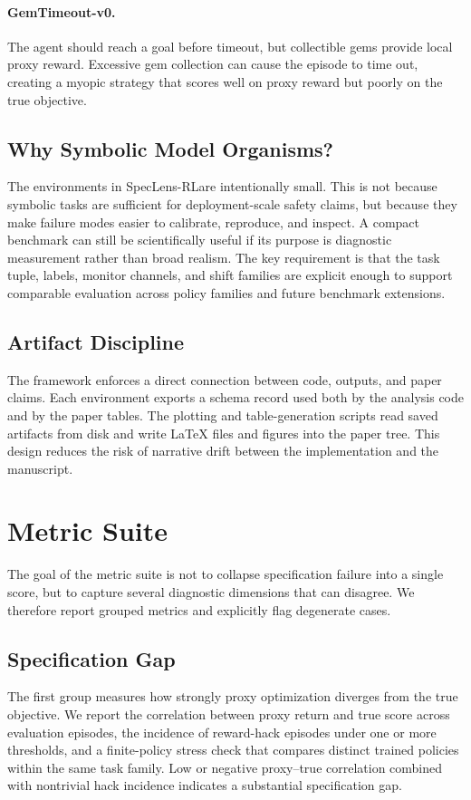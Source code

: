 \documentclass[10pt,twocolumn,letterpaper]{article}
\newcommand{\framework}{SpecLens-RL}
\begin{document}
\paragraph{GemTimeout-v0.}
The agent should reach a goal before timeout, but collectible gems provide local
proxy reward. Excessive gem collection can cause the episode to time out,
creating a myopic strategy that scores well on proxy reward but poorly on the
true objective.

\subsection{Why Symbolic Model Organisms?}
The environments in \framework are intentionally small. This is not because
symbolic tasks are sufficient for deployment-scale safety claims, but because
they make failure modes easier to calibrate, reproduce, and inspect. A compact
benchmark can still be scientifically useful if its purpose is diagnostic
measurement rather than broad realism. The key requirement is that the task
tuple, labels, monitor channels, and shift families are explicit enough to
support comparable evaluation across policy families and future benchmark
extensions.

\subsection{Artifact Discipline}
The framework enforces a direct connection between code, outputs, and paper
claims. Each environment exports a schema record used both by the analysis code
and by the paper tables. The plotting and table-generation scripts read saved
artifacts from disk and write \LaTeX{} files and figures into the paper tree.
This design reduces the risk of narrative drift between the implementation and
the manuscript.

\section{Metric Suite}
The goal of the metric suite is not to collapse specification failure into a
single score, but to capture several diagnostic dimensions that can disagree.
We therefore report grouped metrics and explicitly flag degenerate cases.

\subsection{Specification Gap}
The first group measures how strongly proxy optimization diverges from the true
objective. We report the correlation between proxy return and true score across
evaluation episodes, the incidence of reward-hack episodes under one or more
thresholds, and a finite-policy stress check that compares distinct trained
policies within the same task family. Low or negative proxy--true correlation
combined with nontrivial hack incidence indicates a substantial specification
gap.
\end{document}
